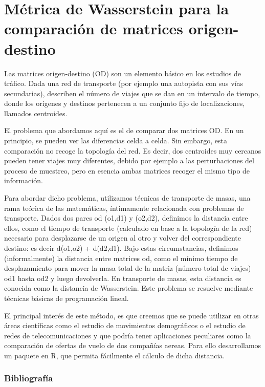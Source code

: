 \chapter{Métrica de Wasserstein para la comparación de matrices origen-destino}




Las matrices origen-destino (OD) son un elemento básico en los estudios de tráfico. Dada una red de transporte (por ejemplo una autopista con sus vías secundarias), describen el número de viajes que se dan en un intervalo de tiempo, donde los orígenes y destinos pertenecen a un conjunto fijo de localizaciones, llamados centroides.

El problema que abordamos aquí es el de comparar dos matrices OD. En un principio, se pueden ver las diferencias celda a celda. Sin embargo, esta comparación no recoge la topología del red. Es decir, dos centroides muy cercanos pueden tener viajes muy diferentes, debido por ejemplo a las perturbaciones del proceso de muestreo, pero en esencia ambas matrices recoger el mismo tipo de información.

Para abordar dicho problema, utilizamos técnicas de transporte de masas, una rama teórica de las matemáticas, íntimamente relacionada con problemas de transporte. Dados dos pares od (o1,d1) y (o2,d2), definimos la distancia entre ellos, como el tiempo de transporte (calculado en base a la topología de la red) necesario para desplazarse de un origen al otro y volver del correspondiente destino: es decir d(o1,o2) + d(d2,d1). Bajo estas circumstancias, definimos (informalmente) la distancia entre matrices od, como el mínimo tiempo de desplazamiento para mover la masa total de la matriz (número total de viajes) od1 hasta od2 y luego devolverla. En transporte de masas, esta distancia es conocida como la distancia de Wasserstein. Este problema se resuelve mediante técnicas básicas de programación lineal.

El principal interés de este método, es que creemos que se puede utilizar en otras áreas científicas como el estudio de movimientos demográficos o el estudio de redes de telecomunicaciones y que podría tener aplicaciones peculiares como la comparación de ofertas de vuelo de dos compañías aereas. Para ello desarrollamos un paquete en R, que permita fácilmente el cálculo de dicha distancia. \bigskip\subsection*{Bibliografía}

